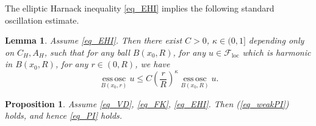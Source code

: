 \documentclass[11pt,a4paper]{article}
\numberwithin{equation}{section}
\newcommand{\eosc}{\operatorname*{ess\,osc}}
\theoremstyle{plain}
\newtheorem{proposition}[theorem]{Proposition}
\newtheorem{lemma}[theorem]{Lemma}
\theoremstyle{definition}
\begin{document}
The elliptic Harnack inequality \ref{eq_EHI} implies the following standard oscillation estimate.

\begin{lemma}\label{lem_osc}
Assume \ref{eq_EHI}. Then there exist $C>0$, $\kappa\in(0,1]$ depending only on $C_H,A_H$, such that for any ball $B(x_0,R)$, for any $u\in \mathcal{F}_{\mathrm{loc}}$ which is harmonic in $B(x_0,R)$, for any $r\in(0,R)$, we have
$$\eosc_{B(x_0,r)}u \le C \left(\frac{r}{R}\right)^\kappa \eosc_{B(x_0,R)}u.$$
\end{lemma}

\begin{proposition}\label{prop_weakPI}
Assume \ref{eq_VD}, \ref{eq_FK}, \ref{eq_EHI}. Then (\ref{eq_weakPI}) holds, and hence \ref{eq_PI} holds.
\end{proposition}
\end{document}
